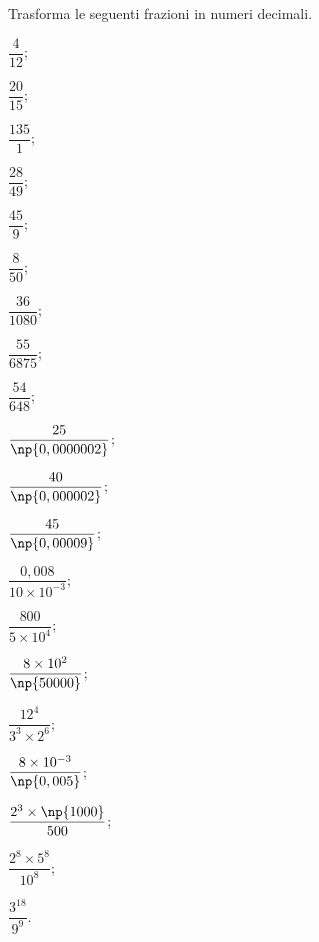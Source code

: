 \begin{esercizio}
\label{ese:3.25}
Trasforma le seguenti frazioni in numeri decimali.
\begin{multicols}{4}
\begin{enumeratea}
\spazielenx
\item $\dfrac{4}{12}$;
\item $\dfrac{20}{15}$;
\item $\dfrac{135}{1}$;
\item $\dfrac{28}{49}$;
\item $\dfrac{45}{9}$;
\item $\dfrac{8}{50}$;
\item $\dfrac{36}{1080}$;
\item $\dfrac{55}{6875}$;
\item $\dfrac{54}{648}$;
\item $\dfrac{25}{\np{0,0000002}}$;
\item $\dfrac{40}{\np{0,000002}}$;
\item $\dfrac{45}{\np{0,00009}}$;
\item $\dfrac{0,008}{10\times 10^{-3}}$;
\item $\dfrac{800}{5\times 10^{4}}$;
\item $\dfrac{8\times 10^{2}}{\np{50000}}$;
\item $\dfrac{12^{4}}{3^{3} \times 2^{6}}$;
\item $\dfrac{8\times 10^{-3}}{\np{0,005}}$;
\item $\dfrac{2^{3}\times \np{1000}}{500}$;
\item $\dfrac{2^{8}\times 5^{8}}{10^{8}}$;
\item $\dfrac{3^{18}}{9^{9}}$.
\end{enumeratea}
\end{multicols}
\end{esercizio}

